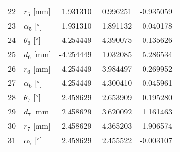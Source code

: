 \documentclass{standalone}%
\begin{document}
\begin{tabular}{llrrr}
22 &              $r_{5}$ [mm] &  1.931310 &   0.996251 &  -0.935059 \\
23 &  $\alpha_{5}$ [$\degree$] &  1.931310 &   1.891132 &  -0.040178 \\
24 &  $\theta_{6}$ [$\degree$] & -4.254449 &  -4.390075 &  -0.135626 \\
25 &              $d_{6}$ [mm] & -4.254449 &   1.032085 &   5.286534 \\
26 &              $r_{6}$ [mm] & -4.254449 &  -3.984497 &   0.269952 \\
27 &  $\alpha_{6}$ [$\degree$] & -4.254449 &  -4.300410 &  -0.045961 \\
28 &  $\theta_{7}$ [$\degree$] &  2.458629 &   2.653909 &   0.195280 \\
29 &              $d_{7}$ [mm] &  2.458629 &   3.620092 &   1.161463 \\
30 &              $r_{7}$ [mm] &  2.458629 &   4.365203 &   1.906574 \\
31 &  $\alpha_{7}$ [$\degree$] &  2.458629 &   2.455522 &  -0.003107 \\
\bottomrule
\end{tabular}
%
\end{document}

